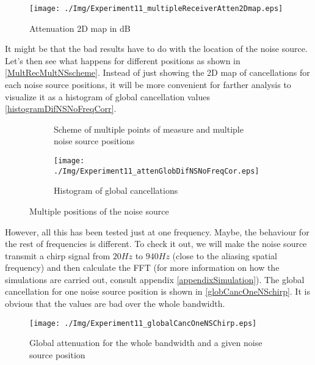 \begin{figure}
	\centering			\texttt{[image: ./Img/Experiment11\_multipleReceiverAtten2Dmap.eps]}
	\caption[Attenuation 2D map]{Attenuation 2D map in dB}
	\label{MultipleReceiverOneNSCanc}
\end{figure}

It might be that the bad results have to do with the location of the noise source. Let's then see what happens for different positions as shown in \autoref{MultRecMultNSscheme}. Instead of just showing the 2D map of cancellations for each noise source positions, it will be more convenient for farther analysis to visualize it as a histogram of global cancellation values
\autoref{histogramDifNSNoFreqCorr}.

\begin{figure}
	\centering
	\begin{subfigure}[b]{0.49\textwidth}
	\centering
	\caption[Scheme of multiple points of measure and multiple noise source positions]{Scheme of multiple points of measure and multiple noise source positions}
	\label{MultRecMultNSscheme}
	\end{subfigure}
	\begin{subfigure}[b]{0.49\textwidth}
	\centering
	\texttt{[image: ./Img/Experiment11\_attenGlobDifNSNoFreqCor.eps]}
	\caption{Histogram of global cancellations}
	\label{histogramDifNSNoFreqCorr}
	\end{subfigure}
	\caption{Multiple positions of the noise source}
\end{figure}

However, all this has been tested just at one frequency. Maybe, the behaviour for the rest of frequencies is different. To check it out, we will make the noise source transmit a chirp signal from $20 \si{Hz}$ to $940 \si{Hz}$ (close to the aliasing spatial frequency) and then calculate the FFT (for more information on how the simulations are carried out, consult appendix \autoref{appendixSimulation}). The global cancellation for one noise source position is shown in \autoref{globCancOneNSchirp}. It is obvious that the values are bad over the whole bandwidth.

\begin{figure}[h]
	\centering
	\texttt{[image: ./Img/Experiment11\_globalCancOneNSChirp.eps]}
	\caption{Global attenuation for the whole bandwidth and a given noise source position}
	\label{globCancOneNSchirp}
\end{figure}


